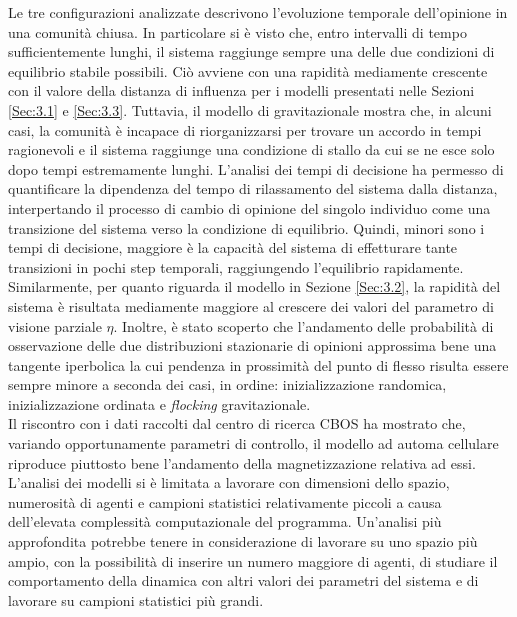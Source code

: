 \documentclass[letterpaper,10pt]{article}
\begin{document}
Le tre configurazioni analizzate descrivono l'evoluzione temporale dell'opinione in una comunità chiusa. In particolare si è visto che, entro intervalli di tempo sufficientemente lunghi, il sistema raggiunge sempre una delle due condizioni di equilibrio stabile possibili.
Ciò avviene con una rapidità mediamente crescente con il valore della distanza di influenza per i modelli presentati nelle Sezioni \ref{Sec:3.1} e \ref{Sec:3.3}. Tuttavia, il modello di  gravitazionale mostra che, in alcuni casi, la comunità è incapace di riorganizzarsi per trovare un accordo in tempi ragionevoli e il sistema raggiunge una condizione di stallo da cui se ne esce solo dopo tempi estremamente lunghi. L'analisi dei tempi di decisione ha permesso di quantificare la dipendenza del tempo di rilassamento del sistema dalla distanza, interpertando il processo di cambio di opinione del singolo individuo come una transizione del sistema verso la condizione di equilibrio. Quindi, minori sono i tempi di decisione, maggiore è la capacità del sistema di effetturare tante transizioni in pochi step temporali, raggiungendo l'equilibrio rapidamente. Similarmente, per quanto riguarda il modello in Sezione \ref{Sec:3.2}, la rapidità del sistema è risultata mediamente maggiore al crescere dei valori del parametro di visione parziale $\eta$.
Inoltre, è stato scoperto che l'andamento delle probabilità di osservazione delle due distribuzioni stazionarie di opinioni approssima bene una tangente iperbolica la cui pendenza in prossimità del punto di flesso risulta essere sempre minore a seconda dei casi, in ordine: inizializzazione randomica, inizializzazione ordinata e \textit{flocking} gravitazionale.
\\ Il riscontro con i dati raccolti dal centro di ricerca CBOS ha mostrato che, variando opportunamente parametri di controllo, il modello ad automa cellulare riproduce piuttosto bene l'andamento della magnetizzazione relativa ad essi.
\\L'analisi dei modelli si è limitata a lavorare con dimensioni dello spazio, numerosità di agenti e campioni statistici relativamente piccoli a causa dell'elevata complessità computazionale del programma. Un'analisi più approfondita potrebbe tenere in considerazione di lavorare su uno spazio più ampio, con la possibilità di inserire un numero maggiore di agenti, di studiare il comportamento della dinamica con altri valori dei parametri del sistema e di lavorare su campioni statistici più grandi.


\medskip

\printbibliography[title={Bibliografia}]
\end{document}
